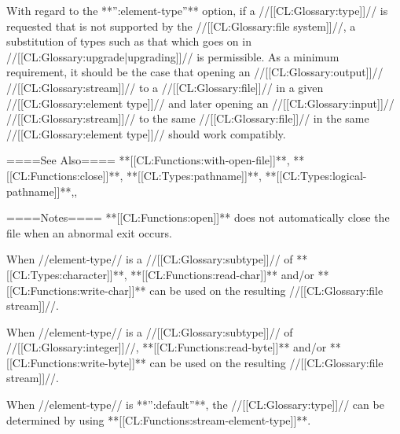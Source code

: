 With regard to the **'':element-type''** option, if a //[[CL:Glossary:type]]// is requested that is not supported by the //[[CL:Glossary:file system]]//, a substitution of types such as that which goes on in //[[CL:Glossary:upgrade|upgrading]]// is permissible. As a minimum requirement, it should be the case that opening an //[[CL:Glossary:output]]// //[[CL:Glossary:stream]]// to a //[[CL:Glossary:file]]// in a given //[[CL:Glossary:element type]]// and later opening an //[[CL:Glossary:input]]// //[[CL:Glossary:stream]]// to the same //[[CL:Glossary:file]]// in the same //[[CL:Glossary:element type]]// should work compatibly.

====See Also====
**[[CL:Functions:with-open-file]]**, **[[CL:Functions:close]]**, **[[CL:Types:pathname]]**, **[[CL:Types:logical-pathname]]**,{\secref\MergingPathnames},

{\secref\PathnamesAsFilenames}

====Notes====
**[[CL:Functions:open]]** does not automatically close the file when an abnormal exit occurs.

When //element-type// is a //[[CL:Glossary:subtype]]// of **[[CL:Types:character]]**, **[[CL:Functions:read-char]]** and/or **[[CL:Functions:write-char]]** can be used on the resulting //[[CL:Glossary:file stream]]//.

When //element-type// is a //[[CL:Glossary:subtype]]// of //[[CL:Glossary:integer]]//, **[[CL:Functions:read-byte]]** and/or **[[CL:Functions:write-byte]]** can be used on the resulting //[[CL:Glossary:file stream]]//.

When //element-type// is **'':default''**, the //[[CL:Glossary:type]]// can be determined by using **[[CL:Functions:stream-element-type]]**.

       
